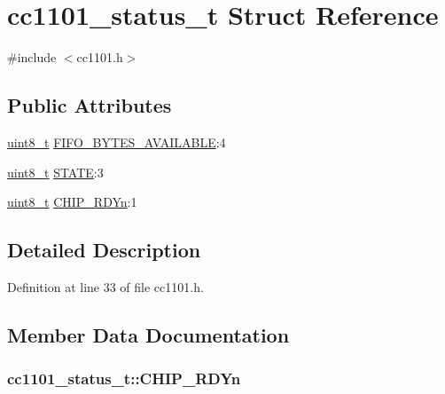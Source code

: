 \hypertarget{structcc1101__status__t}{}\section{cc1101\+\_\+status\+\_\+t Struct Reference}
\label{structcc1101__status__t}


{\ttfamily \#include $<$cc1101.\+h$>$}

\subsection*{Public Attributes}
\begin{DoxyCompactItemize}
\item 
\hyperlink{_p_e___types_8h_aba7bc1797add20fe3efdf37ced1182c5}{uint8\+\_\+t} \hyperlink{structcc1101__status__t_a2201a1786d00a5856d01c4594af8b04a}{F\+I\+F\+O\+\_\+\+B\+Y\+T\+E\+S\+\_\+\+A\+V\+A\+I\+L\+A\+B\+LE}\+:4
\item 
\hyperlink{_p_e___types_8h_aba7bc1797add20fe3efdf37ced1182c5}{uint8\+\_\+t} \hyperlink{structcc1101__status__t_a7bd620d285644ae86e8e81e36d9bba51}{S\+T\+A\+TE}\+:3
\item 
\hyperlink{_p_e___types_8h_aba7bc1797add20fe3efdf37ced1182c5}{uint8\+\_\+t} \hyperlink{structcc1101__status__t_a9d52827d3f542d47ffe7044966b223a5}{C\+H\+I\+P\+\_\+\+R\+D\+Yn}\+:1
\end{DoxyCompactItemize}


\subsection{Detailed Description}


Definition at line 33 of file cc1101.\+h.



\subsection{Member Data Documentation}
\subsubsection[{\texorpdfstring{C\+H\+I\+P\+\_\+\+R\+D\+Yn}{CHIP_RDYn}}]{ cc1101\+\_\+status\+\_\+t\+::\+C\+H\+I\+P\+\_\+\+R\+D\+Yn}\hypertarget{structcc1101__status__t_a9d52827d3f542d47ffe7044966b223a5}{}\label{structcc1101__status__t_a9d52827d3f542d47ffe7044966b223a5}


